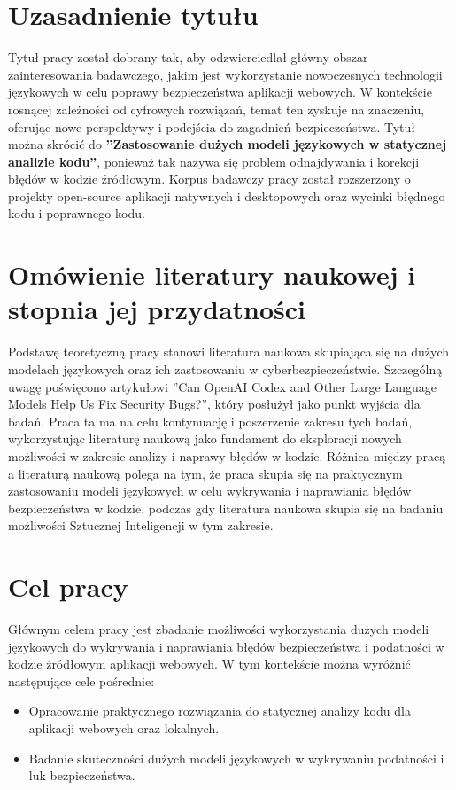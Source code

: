 \section*{Uzasadnienie tytułu}
Tytuł pracy został dobrany tak, aby odzwierciedlał główny obszar zainteresowania badawczego, jakim jest wykorzystanie nowoczesnych technologii językowych w celu poprawy bezpieczeństwa aplikacji webowych. 
W kontekście rosnącej zależności od cyfrowych rozwiązań, temat ten zyskuje na znaczeniu, oferując nowe perspektywy i podejścia do zagadnień bezpieczeństwa.
Tytuł można skrócić do \textbf{''Zastosowanie dużych modeli językowych w statycznej analizie kodu''}, ponieważ tak nazywa się problem odnajdywania i korekcji błędów w kodzie źródłowym. 
Korpus badawczy pracy został rozszerzony o projekty open-source aplikacji natywnych i desktopowych oraz wycinki błędnego kodu i poprawnego kodu. 

\section*{Omówienie literatury naukowej i stopnia jej przydatności}
Podstawę teoretyczną pracy stanowi literatura naukowa skupiająca się na dużych modelach językowych oraz ich zastosowaniu w cyberbezpieczeństwie. Szczególną uwagę poświęcono artykułowi ''Can OpenAI Codex and Other Large Language Models Help Us Fix Security Bugs?'', który posłużył jako punkt wyjścia dla badań. 
Praca ta ma na celu kontynuację i poszerzenie zakresu tych badań, wykorzystując literaturę naukową jako fundament do eksploracji nowych możliwości w zakresie analizy i naprawy błędów w kodzie.
Różnica między pracą a literaturą naukową polega na tym, że praca skupia się na praktycznym zastosowaniu modeli językowych w celu wykrywania i naprawiania błędów bezpieczeństwa w kodzie, podczas gdy literatura naukowa skupia się na badaniu możliwości Sztucznej Inteligencji w tym zakresie.

\section*{Cel pracy}
Głównym celem pracy jest zbadanie możliwości wykorzystania dużych modeli językowych do wykrywania i naprawiania błędów bezpieczeństwa i podatności w kodzie źródłowym aplikacji webowych. 
W tym kontekście można wyróżnić następujące cele pośrednie:
\begin{itemize}
    \item Opracowanie praktycznego rozwiązania do statycznej analizy kodu dla aplikacji webowych oraz lokalnych.
    \item Badanie skuteczności dużych modeli językowych w wykrywaniu podatności i luk bezpieczeństwa.
\end{itemize}

